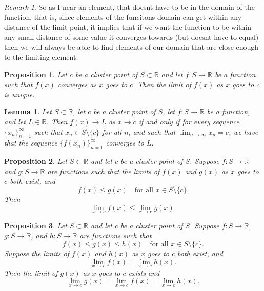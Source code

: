 \documentclass{article}
\newtheorem{lemma}{Lemma}[section]
\newtheorem{proposition}{Proposition}[section]
\theoremstyle{definition}
\theoremstyle{remark}
\newtheorem{remark}{Remark}[section]
\begin{document}
\begin{remark}
So as I near an element, that doesnt have to be in the domain of the function, that is, 
since elements of the funcitons domain can get within any distance of the limit point,
it implies that if we want the function to be within any small distance of some value it converges towards (but doesnt have to equal) 
then we will always be able to find elements of our domain that are close enough to 
the limiting element. 
\end{remark}



\vspace{.5cm}
\begin{proposition}
Let $c$ be a cluster point of $S \subset \mathbb{R}$ and let $f : S \to \mathbb{R}$ be a function such that $f(x)$ converges as $x$ goes to $c$. Then the limit of $f(x)$ as $x$ goes to $c$ is unique.
\end{proposition}


\vspace{.5cm}
\begin{lemma}
Let $S \subset \mathbb{R}$, let $c$ be a cluster point of $S$, let $f : S \to \mathbb{R}$ be a function, and let $L \in \mathbb{R}$. Then $f(x) \to L$ as $x \to c$ if and only if for every sequence $\{x_n\}_{n=1}^{\infty}$ such that $x_n \in S \setminus \{c\}$ for all $n$, and such that $\lim_{n\to\infty} x_n = c$, we have that the sequence $\{f(x_n)\}_{n=1}^{\infty}$ converges to $L$.
\end{lemma}






\vspace{.5cm}
\begin{proposition}
Let $S \subset \mathbb{R}$ and let $c$ be a cluster point of $S$. Suppose $f : S \to \mathbb{R}$ and $g : S \to \mathbb{R}$ are functions such that the limits of $f(x)$ and $g(x)$ as $x$ goes to $c$ both exist, and
\[
f(x) \leq g(x) \quad \text{for all } x \in S \setminus \{c\}.
\]
Then
\[
\lim_{x\to c} f(x) \leq \lim_{x\to c} g(x).
\]
\end{proposition}



\vspace{.5cm}
\begin{proposition}
Let $S \subset \mathbb{R}$ and let $c$ be a cluster point of $S$. Suppose $f : S \to \mathbb{R}$, $g : S \to \mathbb{R}$, and $h : S \to \mathbb{R}$ are functions such that
\[
f(x) \leq g(x) \leq h(x) \quad \text{for all } x \in S \setminus \{c\}.
\]
Suppose the limits of $f(x)$ and $h(x)$ as $x$ goes to $c$ both exist, and
\[
\lim_{x\to c} f(x) = \lim_{x\to c} h(x).
\]
Then the limit of $g(x)$ as $x$ goes to $c$ exists and
\[
\lim_{x\to c} g(x) = \lim_{x\to c} f(x) = \lim_{x\to c} h(x).
\]
\end{proposition}
\end{document}

